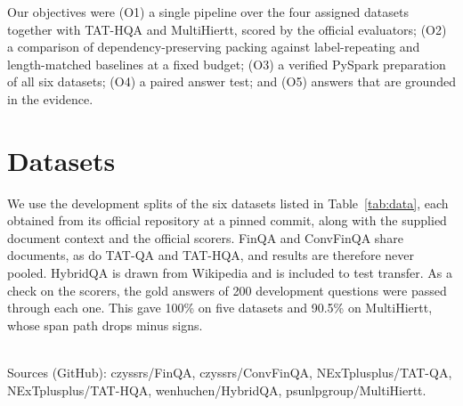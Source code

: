 \documentclass[11pt]{article}
\begin{document}
Our objectives were (O1) a single pipeline over the four assigned datasets together
with TAT-HQA and MultiHiertt, scored by the official evaluators; (O2) a comparison of
dependency-preserving packing against label-repeating and length-matched baselines at a
fixed budget; (O3) a verified PySpark preparation of all six datasets; (O4) a paired
answer test; and (O5) answers that are grounded in the evidence.

\section{Datasets}
\label{sec:data}
We use the development splits of the six datasets listed in Table~\ref{tab:data}, each
obtained from its official repository at a pinned commit, along with the supplied
document context and the official scorers. FinQA and ConvFinQA share documents, as do
TAT-QA and TAT-HQA, and results are therefore never pooled. HybridQA is drawn from
Wikipedia and is included to test transfer. As a check on the scorers, the gold answers
of 200 development questions were passed through each one. This gave 100\% on five
datasets and 90.5\% on MultiHiertt, whose span path drops minus signs.

\begin{table}[t]
\centering\footnotesize\setlength{\tabcolsep}{4pt}
\\[2pt]
{\scriptsize Sources (GitHub): czyssrs/FinQA, czyssrs/ConvFinQA, NExTplusplus/TAT-QA,
NExTplusplus/TAT-HQA, wenhuchen/HybridQA, psunlpgroup/MultiHiertt.}
\caption{Development data. D and O: median document size in tokens with each label
written once and with labels repeated in every cell.}
\label{tab:data}
\end{table}
\end{document}
